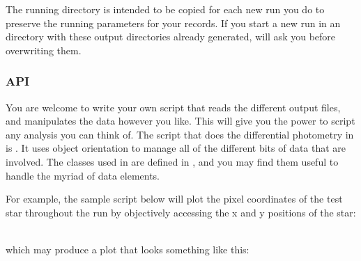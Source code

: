 \documentclass{article}
\begin{document}
\noindent The \oscaar  running directory is intended to be copied for each new run you do to preserve the running parameters for your records. If you start a new run in an \oscaar  directory with these output directories already generated, \oscaar  will ask you before overwriting them. 


\subsubsection{\oscaar  API}

You are welcome to write your own script that reads the different output files, and manipulates the data however you like. This will give you the power to script any analysis you can think of. The script that does the differential photometry in  is . It uses object orientation to manage all of the different bits of data that are involved. The classes used in  are defined in , and you may find them useful to handle the myriad of data elements. 

For example, the sample script below will plot the pixel coordinates of the test star throughout the run by objectively accessing the x and y positions of the star: \\

{\addtolength{\leftskip}{10 mm}
{\scriptsize
\noindent {}\\

	}
}

\noindent which may produce a plot that looks something like this: \\
\end{document}
